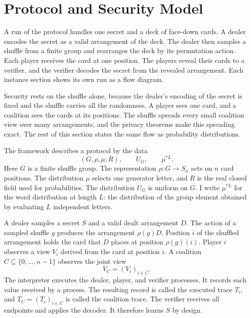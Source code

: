 \documentclass[runningheads]{llncs}
\begin{document}
\section{Protocol and Security Model}\label{sec:model}

A run of the protocol handles one secret and a deck of face-down cards. A
dealer encodes the secret as a valid arrangement of the deck. The dealer
then samples a shuffle from a finite group and rearranges the deck by its
permutation action. Each player receives the card at one position. The
players reveal their cards to a verifier, and the verifier decodes the
secret from the revealed arrangement. Each instance section shows its own
run as a flow diagram.

Security rests on the shuffle alone, because the dealer's encoding of
the secret is fixed and the shuffle carries all the randomness. A player
sees one card, and a coalition sees the cards at its positions. The shuffle spreads every small
coalition view over many arrangements, and the privacy theorems make this
spreading exact. The rest of this section states the same flow as
probability distributions.

The framework describes a protocol by the data
\begin{equation}
  (G,\rho,\mu;R), \qquad U_G, \qquad \mu^{*L}.
  \label{eq:model-data}
\end{equation}
Here $G$ is a finite shuffle group. The representation
$\rho:G\to S_n$ acts on $n$ card positions. The distribution $\mu$ selects one
generator letter, and $R$ is the real closed field used for probabilities.
The distribution $U_G$ is uniform on $G$. I write $\mu^{*L}$ for the word distribution at length $L$: the
distribution of the group element obtained by evaluating $L$ independent
letters.

A dealer samples a secret $S$ and a valid dealt arrangement $D$. The action
of a sampled shuffle $g$ produces the arrangement $\rho(g)D$. Position $i$
of the shuffled arrangement holds the card that $D$ places at position
$\rho(g)(i)$. Player $i$
observes a view $V_i$ derived from the card at position $i$. A coalition
$C\subseteq\{0,\ldots,n-1\}$ observes the joint view
\begin{equation}
  V_C=(V_i)_{i\in C}.
  \label{eq:coalition-view}
\end{equation}
The interpreter executes the dealer, player, and verifier processes. It
records each value received by a process. The resulting record is called the
executed trace $T_i$, and $T_C=(T_i)_{i\in C}$ is called the coalition
trace. The
verifier receives all endpoints and applies the decoder. It therefore learns
$S$ by design.
\end{document}
